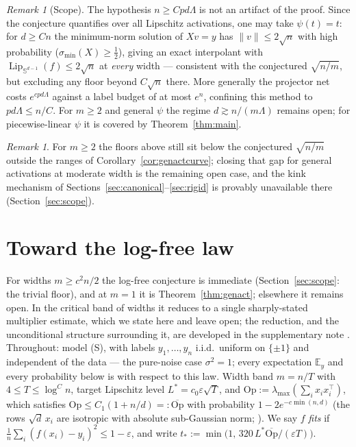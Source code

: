 \documentclass[11pt,reqno]{amsart}
\theoremstyle{plain}
\theoremstyle{definition}
\theoremstyle{remark}
\newtheorem{remark}[theorem]{Remark}
\newcommand{\Sd}{\mathbb{S}^{d-1}}
\newcommand{\EE}{\mathbb{E}}
\newcommand{\eps}{\varepsilon}
\newcommand{\Lip}{\operatorname{Lip}}
\begin{document}
\begin{remark}[Scope]\label{rem:genact2scope}
The hypothesis $n\ge Cpd\Lambda$ is not an artifact of the proof. Since the conjecture quantifies over all Lipschitz activations, one may take $\psi(t)=t$: for $d\ge Cn$ the minimum-norm solution of $Xv=y$ has $\|v\|\le2\sqrt n$ with high probability ($\sigma_{\min}(X)\ge\tfrac12$), giving an exact interpolant with $\Lip_{\Sd}(f)\le2\sqrt n$ at \emph{every} width --- consistent with the conjectured $\sqrt{n/m}$, but excluding any floor beyond $C\sqrt n$ there. More generally the projector net costs $e^{cpd\Lambda}$ against a label budget of at most $e^n$, confining this method to $pd\Lambda\le n/C$. For $m\ge2$ and general $\psi$ the regime $d\gtrsim n/(m\Lambda)$ remains open; for piecewise-linear $\psi$ it is covered by Theorem~\ref{thm:main}.
\end{remark}

\begin{remark}
For $m\ge2$ the floors above still sit below the conjectured $\sqrt{n/m}$ outside the ranges of Corollary~\ref{cor:genactcurve}; closing that gap for general activations at moderate width is the remaining open case, and the kink mechanism of Sections~\ref{sec:canonical}--\ref{sec:rigid} is provably unavailable there (Section~\ref{sec:scope}).
\end{remark}

\section{Toward the log-free law}\label{sec:band}

For widths $m\ge c^2n/2$ the log-free conjecture is immediate (Section~\ref{sec:scope}: the trivial floor), and at $m=1$ it is Theorem~\ref{thm:genact}; elsewhere it remains open. In the critical band of widths it reduces to a single sharply-stated multiplier estimate, which we state here and leave open; the reduction, and the unconditional structure surrounding it, are developed in the supplementary note \cite{supp}. Throughout: model (S), with labels $y_1,\dots,y_n$ i.i.d.\ uniform on $\{\pm1\}$ and independent of the data --- the pure-noise case $\sigma^2=1$; every expectation $\EE_y$ and every probability below is with respect to this law. Width band $m=n/T$ with $4\le T\le\log^Cn$, target Lipschitz level $L^\ast=c_0\eps\sqrt T$, and $\mathrm{Op}:=\lambda_{\max}(\sum_ix_ix_i^\top)$, which satisfies $\mathrm{Op}\le C_1(1+n/d)=:\overline{\mathrm{Op}}$ with probability $1-2e^{-c\min(n,d)}$ (the rows $\sqrt d\,x_i$ are isotropic with absolute sub-Gaussian norm; \cite[Thm.~4.6.1]{Vershynin}). We say $f$ \emph{fits} if $\frac1n\sum_i(f(x_i)-y_i)^2\le1-\eps$, and write $t_\ast:=\min\bigl(1,\,320\,L^\ast\overline{\mathrm{Op}}/(\eps T)\bigr)$.
\end{document}
